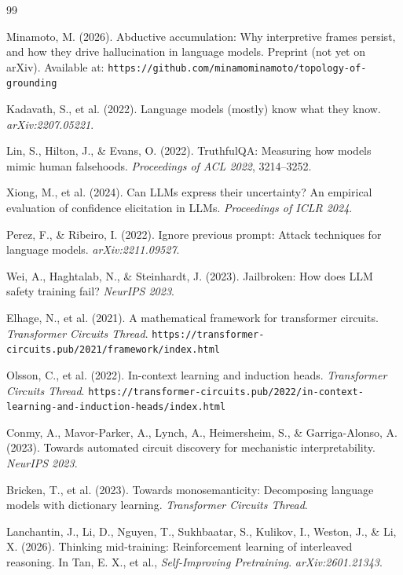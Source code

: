 \documentclass[12pt]{article}
\begin{document}
\begin{thebibliography}{99}

Minamoto, M. (2026). Abductive accumulation: Why interpretive frames
persist, and how they drive hallucination in language models.
Preprint (not yet on arXiv). Available at:
\texttt{https://github.com/minamominamoto/topology-of-grounding}

Kadavath, S., et al. (2022). Language models (mostly) know what
they know. \textit{arXiv:2207.05221}.

Lin, S., Hilton, J., \& Evans, O. (2022). TruthfulQA: Measuring
how models mimic human falsehoods. \textit{Proceedings of ACL 2022},
3214--3252.

Xiong, M., et al. (2024). Can LLMs express their uncertainty?
An empirical evaluation of confidence elicitation in LLMs.
\textit{Proceedings of ICLR 2024}.

Perez, F., \& Ribeiro, I. (2022). Ignore previous prompt:
Attack techniques for language models. \textit{arXiv:2211.09527}.

Wei, A., Haghtalab, N., \& Steinhardt, J. (2023). Jailbroken:
How does LLM safety training fail? \textit{NeurIPS 2023}.

Elhage, N., et al. (2021). A mathematical framework for transformer
circuits. \textit{Transformer Circuits Thread}.
\texttt{https://transformer-circuits.pub/2021/framework/index.html}

Olsson, C., et al. (2022). In-context learning and induction heads.
\textit{Transformer Circuits Thread}.
\texttt{https://transformer-circuits.pub/2022/in-context-learning-and-induction-heads/index.html}

Conmy, A., Mavor-Parker, A., Lynch, A., Heimersheim, S.,
\& Garriga-Alonso, A. (2023). Towards automated circuit discovery
for mechanistic interpretability. \textit{NeurIPS 2023}.

Bricken, T., et al. (2023). Towards monosemanticity: Decomposing
language models with dictionary learning.
\textit{Transformer Circuits Thread}.

Lanchantin, J., Li, D., Nguyen, T., Sukhbaatar, S., Kulikov, I.,
Weston, J., \& Li, X. (2026). Thinking mid-training: Reinforcement
learning of interleaved reasoning. In Tan, E. X., et al.,
\textit{Self-Improving Pretraining}. \textit{arXiv:2601.21343}.


\end{thebibliography}
\end{document}
